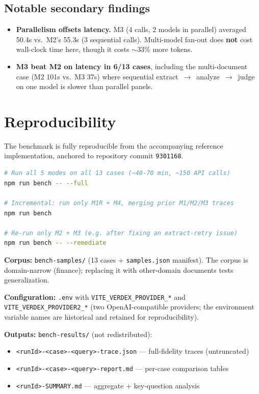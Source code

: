 \documentclass[11pt]{article}
\begin{document}
\subsection{Notable secondary findings}

\begin{itemize}
  \item \textbf{Parallelism offsets latency.} M3 (4 calls, 2 models in parallel)
        averaged 50.4s vs.\ M2's 55.3s (3 sequential calls). Multi-model fan-out
        does \textbf{not} cost wall-clock time here, though it costs $\sim$33\%
        more tokens.
  \item \textbf{M3 beat M2 on latency in 6/13 cases}, including the
        multi-document case (M2 101s vs.\ M3 37s) where sequential
        extract~$\rightarrow$~analyze~$\rightarrow$~judge on one model is slower
        than parallel panels.
\end{itemize}

\section{Reproducibility}

The benchmark is fully reproducible from the accompanying reference
implementation, anchored to repository commit \texttt{9301168}.

\begin{lstlisting}[language=bash]
# Run all 5 modes on all 13 cases (~40-70 min, ~150 API calls)
npm run bench -- --full

# Incremental: run only M1R + M4, merging prior M1/M2/M3 traces
npm run bench

# Re-run only M2 + M3 (e.g. after fixing an extract-retry issue)
npm run bench -- --remediate
\end{lstlisting}

\textbf{Corpus:} \texttt{bench-samples/} (13 cases + \texttt{samples.json}
manifest). The corpus is domain-narrow (finance); replacing it with
other-domain documents tests generalization.

\textbf{Configuration:} \texttt{.env} with \texttt{VITE\_VERDEX\_PROVIDER\_*}
and \texttt{VITE\_VERDEX\_PROVIDER2\_*} (two OpenAI-compatible providers; the
environment variable names are historical and retained for reproducibility).

\textbf{Outputs:} \texttt{bench-results/} (not redistributed):
\begin{itemize}
  \item \verb|<runId>-<case>-<query>-trace.json| --- full-fidelity traces (untruncated)
  \item \verb|<runId>-<case>-<query>-report.md| --- per-case comparison tables
  \item \verb|<runId>-SUMMARY.md| --- aggregate + key-question analysis
\end{itemize}
\end{document}
